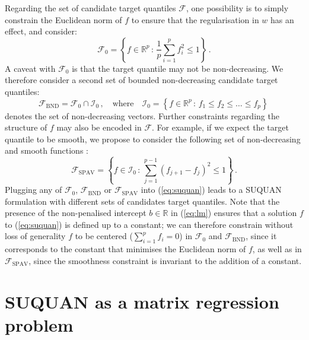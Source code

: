 \documentclass{article}
\newcommand{\RR}{\mathbb{R}} %
\newcommand{\Fcal}{\mathcal{F}}
\newcommand{\Ical}{\mathcal{I}}
\begin{document}
Regarding the set of candidate target quantiles $\Fcal$, one possibility is to simply constrain the Euclidean norm of $f$ to ensure that the regularisation in $w$ has an effect, and consider:
$$
\Fcal_0 = \left\{f \in \RR^p\,:\, \frac{1}{p} \sum_{i=1}^p f_i^2 \leq 1\right\} \,.
$$
 A caveat with $\Fcal_0$ is that the target quantile may not be non-decreasing. We therefore consider a second set of bounded non-decreasing candidate target quantiles:
$$
\Fcal_{\text{BND}}=\Fcal_0 \cap \Ical_0\,, \quad \text{where} \quad  \Ical_0 =  \left\{ f\in\RR^p\,:\, f_1\leq f_2\leq \ldots\leq f_p \right\} \,
$$
denotes the set of non-decreasing vectors.
Further constraints regarding the structure of $f$ may also be encoded in $\Fcal$. For example, if we expect the target quantile to be smooth, we propose to consider the following set of non-decreasing and smooth functions \cite{Sysoev2016smoothed}:
$$
\Fcal_{\text{SPAV}}= \left\{ f \in \Ical_0 \,:\, \sum_{j=1}^{p-1} (f_{j+1} - f_j)^2 \leq 1\right\} \,.
$$
Plugging any of $\Fcal_0$, $\Fcal_{\text{BND}}$ or $\Fcal_{\text{SPAV}}$ into (\ref{eq:suquan}) leads to a SUQUAN formulation with different sets of candidates target quantiles. Note that the presence of the non-penalised intercept $b\in\RR$ in (\ref{eq:lm}) ensures that a solution $f$ to (\ref{eq:suquan}) is defined up to a constant; we can therefore constrain without loss of generality $f$ to be centered ($\sum_{i=1}^p f_i=0$) in $\Fcal_0$ and $\Fcal_{\text{BND}}$, since it corresponds to the constant that minimises the Euclidean norm of $f$, as well as in $\Fcal_{\text{SPAV}}$, since the smoothness constraint is invariant to the addition of a constant.

\section{SUQUAN as a matrix regression problem}
\end{document}
